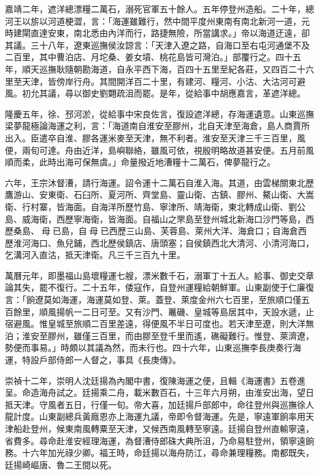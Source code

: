 嘉靖二年，遮洋總漂糧二萬石，溺死官軍五十餘人。五年停登州造船。二十年，總河王以旂以河道梗澀，言：「海運雖難行，然中間平度州東南有南北新河一道，元時建閘直達安東，南北悉由內洋而行，路捷無險，所當講求。」帝以海道迂遠，卻其議。三十八年，遼東巡撫侯汝諒言：「天津入遼之路，自海口至右屯河通堡不及二百里，其中曹泊店、月坨桑、姜女墳、桃花島皆可灣泊。」部覆行之。四十五年，順天巡撫耿隨朝勘海道，自永平西下海，百四十五里至紀各莊，又四百二十六里至天津，皆傍岸行舟。其間開洋百二十里，有建河、糧河、小沽、大沽河可避風。初允其議，尋以御史劉翾疏沮而罷。是年，從給事中胡應嘉言，革遮洋總。

隆慶五年，徐、邳河淤，從給事中宋良佐言，復設遮洋總，存海運遺意。山東巡撫梁夢龍極論海運之利，言：「海道南自淮安至膠州，北自天津至海倉，島人商賈所出入。臣遣卒自淮、膠各運米麥至天津，無不利者。淮安至天津三千三百里，風便，兩旬可達。舟由近洋，島嶼聯絡，雖風可依，視殷明略故道甚安便。五月前風順而柔，此時出海可保無虞。」命量撥近地漕糧十二萬石，俾夢龍行之。

六年，王宗沐督漕，請行海運。詔令運十二萬石自淮入海。其道，由雲梯關東北歷鷹游山、安東衛、石臼所、夏河所、齊堂島、靈山衛、古鎮、膠州、鰲山衛、大嵩衛、行村寨，皆海面。自海洋所歷竹島、寧津所、靖海衛，東北轉成山衛、劉公島、威海衛，西歷寧海衛，皆海面。自福山之罘島至登州城北新海口沙門等島，西歷桑島、母已島，自母已西歷三山島、芙蓉島、萊州大洋、海倉口；自海倉西歷淮河海口、魚兒鋪，西北歷侯鎮店、唐頭塞；自侯鎮西北大清河、小清河海口，乞溝河入直沽，抵天津衛。凡三千三百九十里。

萬曆元年，即墨福山島壞糧運七艘，漂米數千石，溺軍丁十五人。給事、御史交章論其失，罷不復行。二十五年，倭寇作，自登州運糧給朝鮮軍。山東副使于仁廉復言：「餉遼莫如海運，海運莫如登、萊。蓋登、萊度金州六七百里，至旅順口僅五百餘里，順風揚帆一二日可至。又有沙門、鼉磯、皇城等島居其中，天設水遞，止宿避風。惟皇城至旅順二百里差遠，得便風不半日可度也。若天津至遼，則大洋無泊；淮安至膠州，雖僅三百里，而由膠至登千里而遙，礁礙難行。惟登、萊濟遼，勢便而事易。」時頗以其議為然，而未行也。四十六年，山東巡撫李長庚奏行海運，特設戶部侍郎一人督之，事具《長庚傳》。

崇禎十二年，崇明人沈廷揚為內閣中書，復陳海運之便，且輯《海運書》五卷進呈。命造海舟試之。廷揚乘二舟，載米數百石，十三年六月朔，由淮安出海，望日抵天津。守風者五日，行僅一旬。帝大喜，加廷揚戶部郎中，命往登州與巡撫徐人龍計度。山東副總兵黃廕恩亦上海運九議，帝即令督海運。先是，寧遠軍餉率用天津船赴登州，候東南風轉粟至天津，又候西南風轉至寧遠。廷揚自登州直輸寧遠，省費多。尋命赴淮安經理海運，為督漕侍郎硃大典所沮，乃命易駐登州，領寧遠餉務。十六年加光祿少卿。福王時，命廷揚以海舟防江，尋命兼理糧務。南都既失，廷揚崎嶇唐、魯二王間以死。

